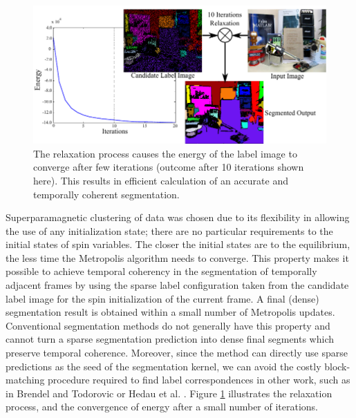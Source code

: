 \begin{figure}
\label{fig:Convergence}
\centering
\includegraphics[width=\linewidth]{figures/ECCV2012/ConvergenceFig2.pdf}
\caption[Relaxation Convergence]{The relaxation process causes the energy of the label image to converge after few iterations (outcome after 10 iterations shown here). This results in efficient calculation of an accurate and temporally coherent segmentation.}
\label{fig:Convergence}
\end{figure}

Superparamagnetic clustering of data was chosen due to its flexibility in allowing the use of any initialization state; there are no particular requirements to the initial states of spin variables. The closer the initial states are to the equilibrium, the less time the Metropolis algorithm needs to converge. This property makes it possible to achieve temporal coherency in the segmentation of temporally adjacent frames by using the sparse label configuration taken from the candidate label image for the spin initialization of the current frame. A final (dense) segmentation result is obtained within a small number of Metropolis updates. Conventional segmentation methods do not generally have this property and cannot turn a sparse segmentation prediction into dense final segments which preserve temporal coherence. Moreover, since the method can directly use sparse predictions as the seed of the segmentation kernel, we can avoid the costly block-matching procedure required to find label correspondences in other 
work, such as in Brendel and Todorovic \cite{SegTrackRegions} or Hedau et al.  \cite{MatchingUnstable}. Figure \ref{fig:Convergence} illustrates the relaxation process, and the convergence of energy after a small number of iterations. 

